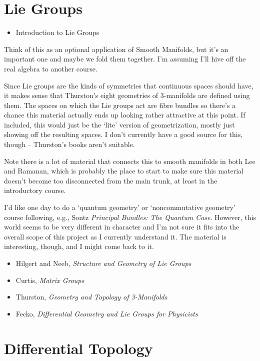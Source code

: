 \documentclass[article]{article}
\begin{document}
\section{Lie Groups}

\begin{itemize}
	\item{Introduction to Lie Groups}
\end{itemize}

Think of this as an optional application of Smooth Manifolds, but it's an important one and maybe we fold them together. I'm assuming I'll hive off the real algebra to another course. 

Since Lie groups are the kinds of symmetries that continuous spaces should have, it makes sense that Thurston's eight geometries of 3-manifolds are defined using them. The spaces on which the Lie groups act are fibre bundles so there's a chance this material actually ends up looking rather attractive at this point. If included, this would just be the `lite' version of geometrization, mostly just showing off the resulting spaces. I don't currently have a good source for this, though -- Thurston's books aren't suitable.

Note there is a lot of material that connects this to smooth manifolds in both Lee and Ramanan, which is probably the place to start to make sure this material doesn't become too disconnected from the main trunk, at least in the introductory course. 

I'd like one day to do a `quantum geometry' or `noncommutative geometry' course following, e.g., Sontz \textit{Principal Bundles: The Quantum Case}. However, this world seems to be very different in character and I'm not sure it fits into the overall scope of this project as I currently understand it. The material is interesting, though, and I might come back to it.

\begin{itemize}
	\item[]{Hilgert and Neeb, \textit{Structure and Geometry of Lie Groups}}
	\item[]{Curtis, \textit{Matrix Groups}}
	\item[]{Thurston, \textit{Geometry and Topology of 3-Manifolds}}
	\item Fecko, \textit{Differential Geometry and Lie Groups for Physicists}
\end{itemize}

\section{Differential Topology}
\end{document}
